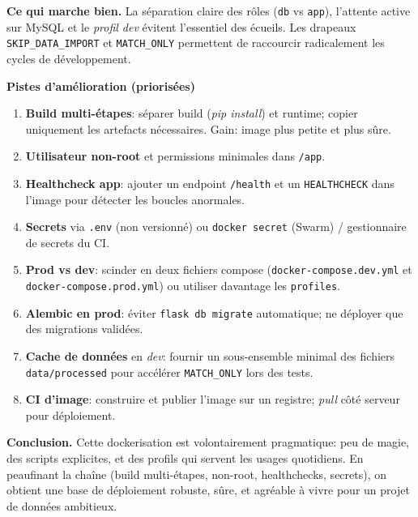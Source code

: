 \textbf{Ce qui marche bien.} La séparation claire des rôles (\texttt{db} vs \texttt{app}), l'attente active sur MySQL et le \textit{profil dev} évitent l'essentiel des écueils. Les drapeaux \texttt{SKIP\_DATA\_IMPORT} et \texttt{MATCH\_ONLY} permettent de raccourcir radicalement les cycles de développement.

\medskip
\noindent\textbf{Pistes d'amélioration (priorisées)}
\begin{enumerate}
  \item \textbf{Build multi-étapes}: séparer build (\textit{pip install}) et runtime; copier uniquement les artefacts nécessaires. Gain: image plus petite et plus sûre.
  \item \textbf{Utilisateur non-root} et permissions minimales dans \texttt{/app}.
  \item \textbf{Healthcheck app}: ajouter un endpoint \texttt{/health} et un \texttt{HEALTHCHECK} dans l'image pour détecter les boucles anormales.
  \item \textbf{Secrets} via \texttt{.env} (non versionné) ou \texttt{docker secret} (Swarm) / gestionnaire de secrets du CI.
  \item \textbf{Prod vs dev}: scinder en deux fichiers compose (\texttt{docker-compose.dev.yml} et \texttt{docker-compose.prod.yml}) ou utiliser davantage les \texttt{profiles}.
  \item \textbf{Alembic en prod}: éviter \texttt{flask db migrate} automatique; ne déployer que des migrations validées.
  \item \textbf{Cache de données} en \textit{dev}: fournir un sous-ensemble minimal des fichiers \texttt{data/processed} pour accélérer \texttt{MATCH\_ONLY} lors des tests.
  \item \textbf{CI d'image}: construire et publier l'image sur un registre; \textit{pull} côté serveur pour déploiement.
\end{enumerate}

\medskip
\noindent\textbf{Conclusion.} Cette dockerisation est volontairement pragmatique: peu de magie, des scripts explicites, et des profils qui servent les usages quotidiens. En peaufinant la chaîne (build multi-étapes, non-root, healthchecks, secrets), on obtient une base de déploiement robuste, sûre, et agréable à vivre pour un projet de données ambitieux.
